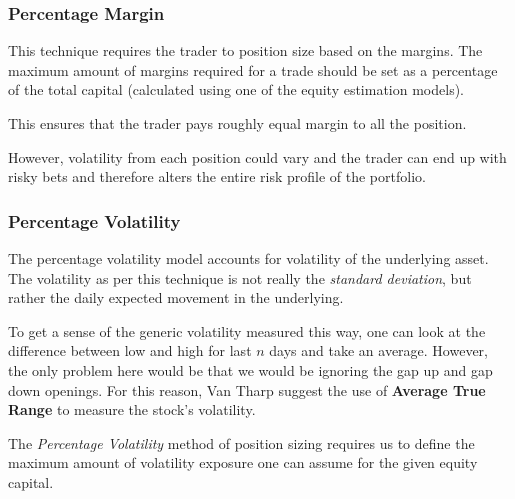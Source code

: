 

\subsubsection{Percentage Margin}
This technique requires the trader to position size based on the margins. The maximum amount of margins required for a trade should be set as a percentage of the total capital (calculated using one of the equity estimation models).

This ensures that the trader pays roughly equal margin to all the position.

However, volatility from each position could vary and the trader can end up with risky bets and therefore alters the entire risk profile of the portfolio.

\subsubsection{Percentage Volatility}

The percentage volatility model accounts for volatility of the underlying asset. The volatility as per this technique is not really the \emph{standard deviation}, but rather the daily expected movement in the underlying.


To get a sense of the generic volatility measured this way, one can look at the difference between low and high for last $n$ days and take an average. However, the only problem here would be that we would be ignoring the gap up and gap down openings. For this reason, Van Tharp suggest the use of \textbf{Average True Range} to measure the stock’s volatility.

The \emph{Percentage Volatility} method of position sizing requires us to define the maximum amount of volatility exposure one can assume for the given equity capital.


